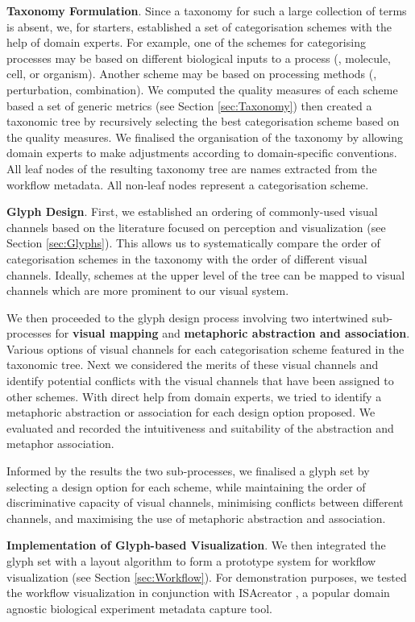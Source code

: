 \textbf{Taxonomy Formulation}. Since a taxonomy for such a large collection of terms is absent, we, for starters, established a set of categorisation schemes with the help of domain experts. For example, one of the schemes for categorising processes may be based on different biological inputs to a process (\eg, molecule, cell, or organism). Another scheme may be based on processing methods (\eg, perturbation, combination). We computed the quality measures of each scheme based a set of generic metrics (see Section \ref{sec:Taxonomy}) then created a taxonomic tree by recursively selecting the best categorisation scheme based on the quality measures. We finalised the organisation of the taxonomy by allowing domain experts to make adjustments according to domain-specific conventions. All leaf nodes of the resulting taxonomy tree are names extracted from the workflow metadata. All non-leaf nodes represent a categorisation scheme.

\textbf{Glyph Design}. First, we established an ordering of commonly-used visual channels based on the literature focused on perception and visualization (see Section \ref{sec:Glyphs}). This allows us to systematically compare the order of categorisation schemes in the taxonomy with the order of different visual channels. Ideally, schemes at the upper level of the tree can be mapped to visual channels which are more prominent to our visual system.

We then proceeded to the glyph design process involving two intertwined sub-processes for \textbf{visual mapping} and \textbf{metaphoric abstraction and association}.
Various options of visual channels for each categorisation scheme featured in the taxonomic tree.
Next we considered the merits of these visual channels and identify potential conflicts with the visual channels that have been assigned to other schemes.
With direct help from domain experts, we tried to identify a metaphoric abstraction or association for each design option proposed.
We evaluated and recorded the intuitiveness and suitability of the abstraction and metaphor association.

Informed by the results the two sub-processes, we finalised a glyph set by selecting a design option for each scheme, while maintaining the order of discriminative capacity of visual channels, minimising conflicts between different channels, and maximising the use of metaphoric abstraction and association.

\textbf{Implementation of Glyph-based Visualization}.
We then integrated the glyph set with a layout algorithm to form a prototype system for workflow visualization (see Section \ref{sec:Workflow}).
For demonstration purposes, we tested the workflow visualization in conjunction with ISAcreator \cite{rocca-serra10}, a popular domain agnostic biological experiment metadata capture tool.

